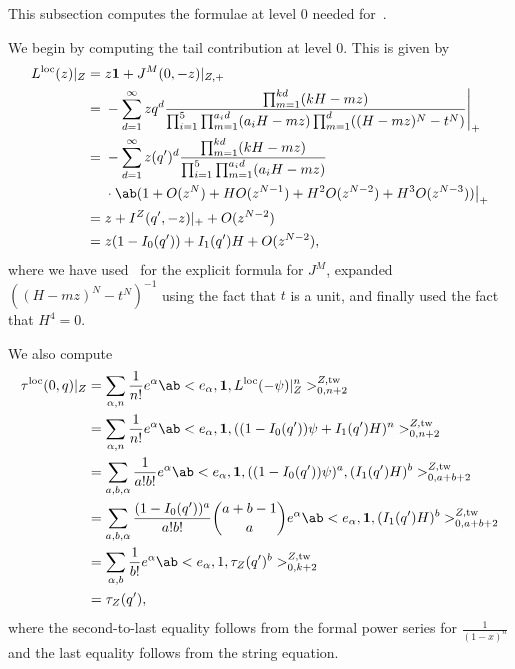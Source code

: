 \documentclass[10pt]{amsart}
\theoremstyle{definition}
\theoremstyle{remark}
\theoremstyle{plain}
\theoremstyle{definition}
\theoremstyle{remark}
\newcommand{\mr}[1]{\mathrm{#1}}
\newcommand{\1}{\mathbf{1}}
\newcommand{\2}{\mathbf{2}}
\newcommand{\3}{\mathbf{3}}
\newcommand{\loc}{\mr{loc}}
\newcommand{\tw}{\mr{tw}}
\numberwithin{equation}{section}
\begin{document}
This subsection computes the formulae at level $0$ needed for~.

We begin by computing the tail contribution at level $0$. This is given by
\begin{align*}
    L^{\loc}(z)|_Z ={}& z \1 + J^M(0,-z)|_{Z,+} \\
    ={}& - \sum_{d=1}^{\infty} z q^d \frac{\prod_{m=1}^{kd}(kH-mz)}{\prod_{i=1}^5 \prod_{m=1}^{a_i d}(a_i H - mz) \prod_{m=1}^d ((H-mz)^N - t^N)} \Bigg\vert_+ \\
    ={}& -\sum_{d=1}^{\infty} z (q')^d\frac{\prod_{m=1}^{kd}(kH-mz)}{\prod_{i=1}^5 \prod_{m=1}^{a_i d}(a_i H - mz)} \\
    & \cdot \ab(1 + O(z^N) + H O(z^{N-1}) + H^2 O(z^{N-2}) + H^3 O(z^{N-3})) \big\vert_+ \\
    ={}& z + I^Z(q',-z)|_+ + O(z^{N-2}) \\
    ={}& z(1-I_0(q')) + I_1(q')H + O(z^{N-2}),
\end{align*}
where we have used~ for the explicit formula for $J^M$, expanded $((H-mz)^N-t^N)^{-1}$ using the fact that $t$ is a unit, and finally used the fact that $H^4 = 0$.

We also compute
\begin{align*}
    \tau^{\loc}(0,q)|_Z &= \sum_{\alpha, n} \frac{1}{n!} e^{\alpha} \ab<e_{\alpha}, \1, L^{\loc}(-\psi)|_Z^n>_{0,n+2}^{Z,\tw} \\
    &= \sum_{\alpha, n} \frac{1}{n!} e^{\alpha} \ab<e_{\alpha}, \1, ((1-I_0(q'))\psi + I_1(q')H)^n>_{0,n+2}^{Z,\tw} \\
    &= \sum_{a,b,\alpha} \frac{1}{a!b!} e^{\alpha} \ab<e_{\alpha}, \1, ( (1-I_0(q'))\psi )^a, (I_1(q')H)^b>_{0,a+b+2}^{Z,\tw} \\
    &= \sum_{a,b,\alpha} \frac{(1-I_0(q'))^a}{a!b!} \binom{a+b-1}{a} e^{\alpha} \ab<e_{\alpha}, \1, (I_1(q')H)^b>_{0,a+b+2}^{Z,\tw} \\
    &= \sum_{\alpha, b} \frac{1}{b!} e^{\alpha} \ab<e_{\alpha}, 1, \tau_Z(q')^b>_{0,k+2}^{Z,\tw} \\
    &= \tau_Z(q'),
\end{align*}
where the second-to-last equality follows from the formal power series for $\frac{1}{(1-x)^n}$ and the last equality follows from the string equation.
\end{document}
